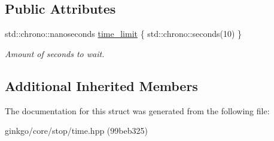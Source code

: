 \subsection*{Public Attributes}
\begin{DoxyCompactItemize}
\item 
\mbox{\label{structgko_1_1stop_1_1Time_1_1parameters__type_aee1d09b9ec4e73561e46e94888cf885a}} 
std\+::chrono\+::nanoseconds \hyperlink{structgko_1_1stop_1_1Time_1_1parameters__type_aee1d09b9ec4e73561e46e94888cf885a}{time\+\_\+limit} \{ std\+::chrono\+::seconds(10) \}
\begin{DoxyCompactList}\small\item\em Amount of seconds to wait. \end{DoxyCompactList}\end{DoxyCompactItemize}
\subsection*{Additional Inherited Members}


The documentation for this struct was generated from the following file\+:\begin{DoxyCompactItemize}
\item 
ginkgo/core/stop/time.\+hpp (99beb325)\end{DoxyCompactItemize}
